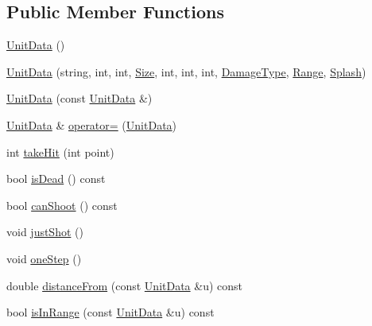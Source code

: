 \subsection*{Public Member Functions}
\begin{DoxyCompactItemize}
\item 
\hyperlink{structghost_1_1UnitData_a39fd037bb4dbd5e041cff9df846dcda8}{Unit\-Data} ()
\item 
\hyperlink{structghost_1_1UnitData_af4044695d01874624ecc4d9c930ed647}{Unit\-Data} (string, int, int, \hyperlink{namespaceghost_a2615b54cc16a8c95ffeeb246ad722833}{Size}, int, int, int, \hyperlink{namespaceghost_ab52582bfe39e47fc05f33770f38185d6}{Damage\-Type}, \hyperlink{structghost_1_1Range}{Range}, \hyperlink{structghost_1_1Splash}{Splash})
\item 
\hyperlink{structghost_1_1UnitData_a8cc814c8ae966037e7abbfe5d27916d6}{Unit\-Data} (const \hyperlink{structghost_1_1UnitData}{Unit\-Data} \&)
\item 
\hyperlink{structghost_1_1UnitData}{Unit\-Data} \& \hyperlink{structghost_1_1UnitData_a2810af3761daf354909d79928d9e2533}{operator=} (\hyperlink{structghost_1_1UnitData}{Unit\-Data})
\item 
int \hyperlink{structghost_1_1UnitData_a5ef93fffa09b0000485c18ccc8d3d523}{take\-Hit} (int point)
\item 
bool \hyperlink{structghost_1_1UnitData_acf70a2bb9d4e886c766773cc4baad7b8}{is\-Dead} () const 
\item 
bool \hyperlink{structghost_1_1UnitData_a729f2b0dd804c95e81d99ee1695445a5}{can\-Shoot} () const 
\item 
void \hyperlink{structghost_1_1UnitData_a348b16b3507443c35ab5534462a75069}{just\-Shot} ()
\item 
void \hyperlink{structghost_1_1UnitData_aa8d86c5e682e6cb6bc5db4a410943fc3}{one\-Step} ()
\item 
double \hyperlink{structghost_1_1UnitData_ac155aaf4a8af1e4667aaa6fed00b04e2}{distance\-From} (const \hyperlink{structghost_1_1UnitData}{Unit\-Data} \&u) const 
\item 
bool \hyperlink{structghost_1_1UnitData_a0384ce01bf8f460a3db2d57d34f9aa96}{is\-In\-Range} (const \hyperlink{structghost_1_1UnitData}{Unit\-Data} \&u) const 
\end{DoxyCompactItemize}
